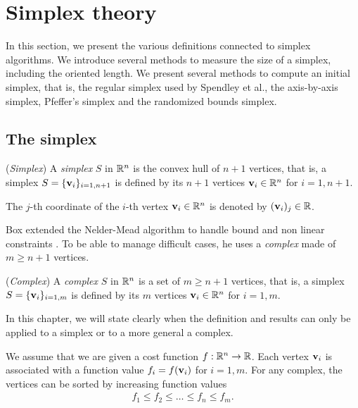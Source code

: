 \chapter{Simplex theory}

In this section, we present the various definitions connected
to simplex algorithms. We introduce several methods to measure 
the size of a simplex, including the oriented length. 
We present several methods to compute an
initial simplex, that is, the regular simplex used by Spendley et al.,
the axis-by-axis simplex, Pfeffer's simplex and the randomized 
bounds simplex.

\section{The simplex}

\begin{definition}
(\emph{Simplex})
A \emph{simplex} $S$ in $\mathbb{R}^n$ is the convex hull of $n+1$ vertices, that is, 
a simplex $S=\{\mathbf{v}_i\}_{i=1,n+1}$ is defined 
by its $n+1$ vertices $\mathbf{v}_i \in \mathbb{R}^n$ for $i=1,n+1$.
\end{definition}

The $j$-th coordinate of the $i$-th vertex $\mathbf{v}_i\in\mathbb{R}^n$ is denoted  
by $(\mathbf{v}_i)_j\in\mathbb{R}$.

Box extended the Nelder-Mead algorithm to handle bound and non linear constraints \cite{Box1965}.
To be able to manage difficult cases, he uses a \emph{complex} made of $m\geq n+1$ vertices.

\begin{definition}
(\emph{Complex})
A \emph{complex} $S$ in $\mathbb{R}^n$ is a set of $m\geq n+1$ vertices, that is, 
a simplex $S=\{\mathbf{v}_i\}_{i=1,m}$ is defined 
by its $m$ vertices $\mathbf{v}_i \in \mathbb{R}^n$ for $i=1,m$.
\end{definition}

In this chapter, we will state clearly when the definition and results can only be applied 
to a simplex or to a more general a complex. 

We assume that we are given a cost function $f:\mathbb{R}^n\rightarrow\mathbb{R}$.
Each vertex $\mathbf{v}_i$ is associated with a function value $f_i = f(\mathbf{v}_i)$ for $i=1,m$.
For any complex, the vertices can be sorted by increasing function values 
\begin{eqnarray}
\label{simplex-sortedfv}
f_1 \leq f_2 \leq \ldots \leq f_n \leq f_m.
\end{eqnarray}

